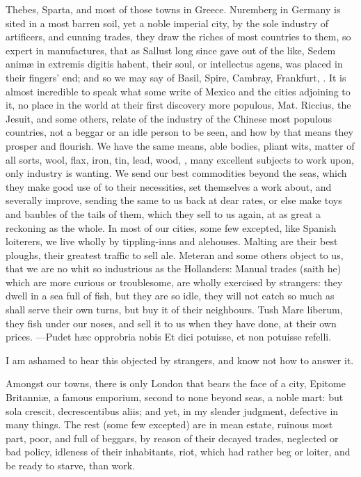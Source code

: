 {Thebes, Sparta, and most of those towns in Greece. Nuremberg in Germany
is sited in a most barren soil, yet a noble imperial city, by the sole
industry of artificers, and cunning trades, they draw the riches of
most countries to them, so expert in manufactures, that as Sallust long
since gave out of the like, Sedem anim\ae{} in extremis digitis habent,
their soul, or intellectus agens, was placed in their fingers' end; and
so we may say of Basil, Spire, Cambray, Frankfurt, \etc{}. It is almost
incredible to speak what some write of Mexico and the cities adjoining
to it, no place in the world at their first discovery more populous,
Mat. Riccius, the Jesuit, and some others, relate of the industry
of the Chinese most populous countries, not a beggar or an idle person
to be seen, and how by that means they prosper and flourish. We have
the same means, able bodies, pliant wits, matter of all sorts, wool,
flax, iron, tin, lead, wood, \etc{}, many excellent subjects to work upon,
only industry is wanting. We send our best commodities beyond the seas,
which they make good use of to their necessities, set themselves a work
about, and severally improve, sending the same to us back at dear
rates, or else make toys and baubles of the tails of them, which they
sell to us again, at as great a reckoning as the whole. In most of our
cities, some few excepted, like Spanish loiterers, we live wholly
by tippling-inns and alehouses. Malting are their best ploughs, their
greatest traffic to sell ale. Meteran and some others object to
us, that we are no whit so industrious as the Hollanders: Manual trades
(saith he) which are more curious or troublesome, are wholly exercised
by strangers: they dwell in a sea full of fish, but they are so idle,
they will not catch so much as shall serve their own turns, but buy it
of their neighbours. Tush Mare liberum, they fish under our noses,
and sell it to us when they have done, at their own prices.
---Pudet h\ae{}c opprobria nobis
Et dici potuisse, et non potuisse refelli.

I am ashamed to hear this objected by strangers, and know not how to
answer it.

Amongst our towns, there is only London that bears the face of a
city, Epitome Britanni\ae{}, a famous emporium, second to none beyond
seas, a noble mart: but sola crescit, decrescentibus aliis; and yet, in
my slender judgment, defective in many things. The rest (some few
excepted) are in mean estate, ruinous most part, poor, and full of
beggars, by reason of their decayed trades, neglected or bad policy,
idleness of their inhabitants, riot, which had rather beg or loiter,
and be ready to starve, than work.

}
